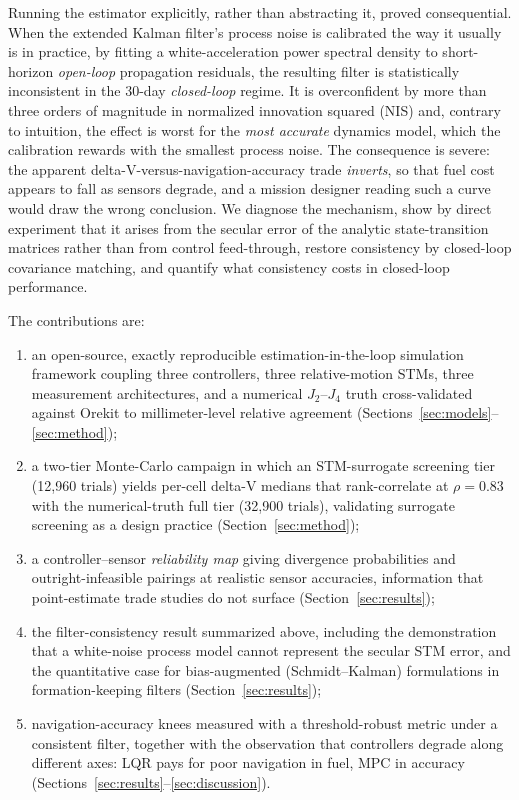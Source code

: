 Running the estimator explicitly, rather than abstracting it, proved
consequential. When the extended Kalman filter's process noise is calibrated
the way it usually is in practice, by fitting a white-acceleration power
spectral density to short-horizon \emph{open-loop} propagation residuals,
the resulting filter is statistically inconsistent in the 30-day
\emph{closed-loop} regime. It is overconfident by more than three orders of
magnitude in normalized innovation squared (NIS) and, contrary to intuition,
the effect is worst for the \emph{most accurate} dynamics model, which the
calibration rewards with the smallest process noise. The consequence is
severe: the apparent delta-V-versus-navigation-accuracy trade
\emph{inverts}, so that fuel cost appears to fall as sensors degrade, and a
mission designer reading such a curve would draw the wrong conclusion. We
diagnose the mechanism, show by direct experiment that it arises from the
secular error of the analytic state-transition matrices rather than from
control feed-through, restore consistency by closed-loop covariance
matching, and quantify what consistency costs in closed-loop performance.

The contributions are:
\begin{enumerate}
  \item an open-source, exactly reproducible estimation-in-the-loop
    simulation framework coupling three controllers, three relative-motion
    STMs, three measurement architectures, and a numerical $J_2$--$J_4$
    truth cross-validated against Orekit to millimeter-level relative
    agreement (Sections~\ref{sec:models}--\ref{sec:method});
  \item a two-tier Monte-Carlo campaign in which an STM-surrogate screening
    tier (12{,}960 trials) yields per-cell delta-V medians that
    rank-correlate at $\rho = 0.83$ with the numerical-truth full tier
    (32{,}900 trials), validating surrogate screening as a design practice
    (Section~\ref{sec:method});
  \item a controller--sensor \emph{reliability map} giving divergence
    probabilities and outright-infeasible pairings at realistic sensor
    accuracies, information that point-estimate trade studies do not
    surface (Section~\ref{sec:results});
  \item the filter-consistency result summarized above, including the
    demonstration that a white-noise process model cannot represent the
    secular STM error, and the quantitative case for bias-augmented
    (Schmidt--Kalman) formulations in formation-keeping filters
    (Section~\ref{sec:results});
  \item navigation-accuracy knees measured with a threshold-robust metric
    under a consistent filter, together with the observation that
    controllers degrade along different axes: LQR pays for poor navigation
    in fuel, MPC in accuracy
    (Sections~\ref{sec:results}--\ref{sec:discussion}).
\end{enumerate}

